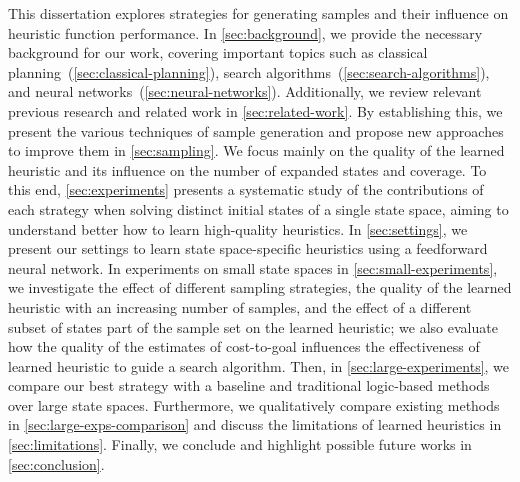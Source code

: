 This dissertation explores strategies for generating samples and their influence on heuristic function performance. In \cref{sec:background}, we provide the necessary background for our work, covering important topics such as classical planning~(\cref{sec:classical-planning}), search algorithms~(\cref{sec:search-algorithms}), and neural networks~(\cref{sec:neural-networks}). Additionally, we review relevant previous research and related work in \cref{sec:related-work}. By establishing this, we present the various techniques of sample generation and propose new approaches to improve them in \cref{sec:sampling}. We focus mainly on the quality of the learned heuristic and its influence on the number of expanded states and coverage. To this end, \cref{sec:experiments} presents a systematic study of the contributions of each strategy when solving distinct initial states of a single state space, aiming to understand better how to learn high-quality heuristics. In \cref{sec:settings}, we present our settings to learn state space-specific heuristics using a feedforward neural network. In experiments on small state spaces in \cref{sec:small-experiments}, we investigate the effect of different sampling strategies, the quality of the learned heuristic with an increasing number of samples, and the effect of a different subset of states part of the sample set on the learned heuristic; we also evaluate how the quality of the estimates of cost-to-goal influences the effectiveness of learned heuristic to guide a search algorithm. Then, in \cref{sec:large-experiments}, we compare our best strategy with a baseline and traditional logic-based methods over large state spaces. Furthermore, we qualitatively compare existing methods in \cref{sec:large-exps-comparison} and discuss the limitations of learned heuristics in \cref{sec:limitations}. Finally, we conclude and highlight possible future works in \cref{sec:conclusion}.
